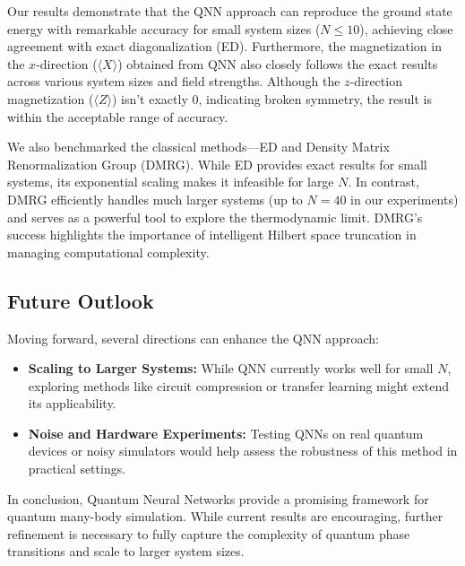 \documentclass[a4paper]{article}
\begin{document}
Our results demonstrate that the QNN approach can reproduce the ground state energy with remarkable accuracy for small system sizes ($N \leq 10$), achieving close agreement with exact diagonalization (ED). Furthermore, the magnetization in the $x$-direction ($\langle X \rangle$) obtained from QNN also closely follows the exact results across various system sizes and field strengths. Although the $z$-direction magnetization ($\langle Z \rangle$) isn't exactly 0, indicating broken symmetry, the result is within the acceptable range of accuracy. 

We also benchmarked the classical methods—ED and Density Matrix Renormalization Group (DMRG). While ED provides exact results for small systems, its exponential scaling makes it infeasible for large $N$. In contrast, DMRG efficiently handles much larger systems (up to $N=40$ in our experiments) and serves as a powerful tool to explore the thermodynamic limit. DMRG's success highlights the importance of intelligent Hilbert space truncation in managing computational complexity.

\subsection{Future Outlook}
Moving forward, several directions can enhance the QNN approach:

\begin{itemize}
    \item \textbf{Scaling to Larger Systems:} While QNN currently works well for small $N$, exploring methods like circuit compression or transfer learning might extend its applicability.
    \item \textbf{Noise and Hardware Experiments:} Testing QNNs on real quantum devices or noisy simulators would help assess the robustness of this method in practical settings.
\end{itemize}

In conclusion, Quantum Neural Networks provide a promising framework for quantum many-body simulation. While current results are encouraging, further refinement is necessary to fully capture the complexity of quantum phase transitions and scale to larger system sizes.

\newpage
\appendix
\end{document}
